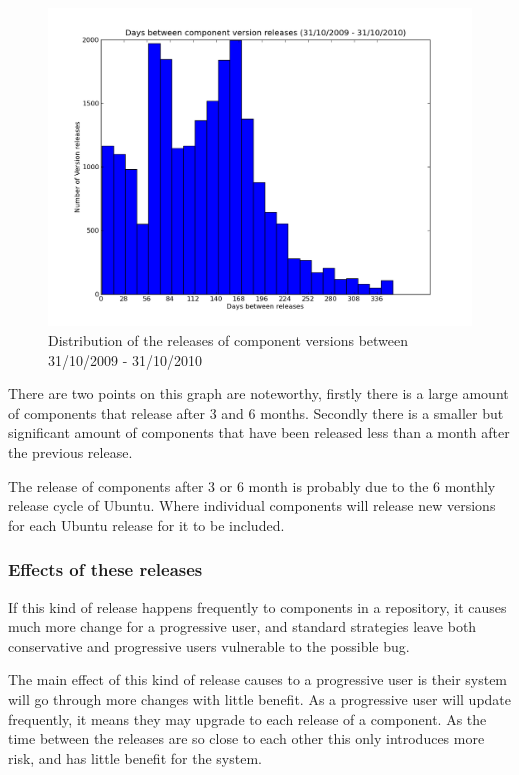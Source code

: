 \begin{figure}[htp]
\begin{center}
  \includegraphics[width=\textwidth]{ubuntusimulationpics/versionreleasedistribution}
  \caption[labelInTOC]{Distribution of the releases of component versions between 31/10/2009 - 31/10/2010}
  \label{comeponentversionreleases}
\end{center}
\end{figure}

There are two points on this graph are noteworthy, firstly there is a large amount of components that release after 3 and 6 months.
Secondly there is a smaller but significant amount of components that have been released less than a month after the previous release.

The release of components after 3 or 6 month is probably due to the 6 monthly release cycle of Ubuntu.
Where individual components will release new versions for each Ubuntu release for it to be included.

\subsubsection{Effects of these releases}
If this kind of release happens frequently to components in a repository, it causes much more change for a progressive user,
and standard strategies leave both conservative and progressive users vulnerable to the possible bug.

The main effect of this kind of release causes to a progressive user is their system will go through more changes with little benefit.
As a progressive user will update frequently, it means they may upgrade to each release of a component.
As the time between the releases are so close to each other this only introduces more risk, and has little benefit for the system.

